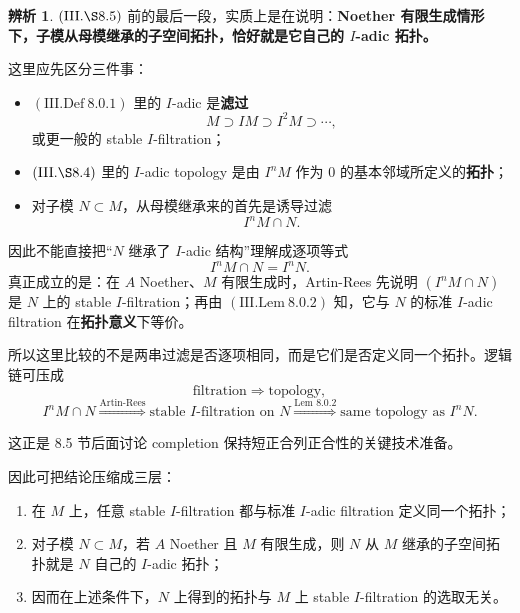 \documentclass[a4paper]{ctexart}
\theoremstyle{definition}
\theoremstyle{analysis}
\newtheorem{remark}{辨析}[section]
\theoremstyle{plain}
\begin{document}
\begin{remark}
\label{rem:artin-rees-subspace-topology}
\((\mathrm{III.\S 8.5})\) 前的最后一段，实质上是在说明：\textbf{Noether 有限生成情形下，子模从母模继承的子空间拓扑，恰好就是它自己的 \(I\)-adic 拓扑。}

这里应先区分三件事：
\begin{itemize}
  \item \((\mathrm{III.Def}\ 8.0.1)\) 里的 \(I\)-adic 是\textbf{滤过}
  \[
    M\supset IM\supset I^2M\supset \cdots,
  \]
  或更一般的 stable \(I\)-filtration；
  \item \((\mathrm{III.\S 8.4})\) 里的 \(I\)-adic topology 是由 \(I^nM\) 作为 \(0\) 的基本邻域所定义的\textbf{拓扑}；
  \item 对子模 \(N\subset M\)，从母模继承来的首先是诱导过滤
  \[
    I^nM\cap N.
  \]
\end{itemize}

因此不能直接把“\(N\) 继承了 \(I\)-adic 结构”理解成逐项等式
\[
  I^nM\cap N = I^nN.
\]
真正成立的是：在 \(A\) Noether、\(M\) 有限生成时，Artin-Rees 先说明 \((I^nM\cap N)\) 是 \(N\) 上的 stable \(I\)-filtration；再由 \((\mathrm{III.Lem}\ 8.0.2)\) 知，它与 \(N\) 的标准 \(I\)-adic filtration 在\textbf{拓扑意义}下等价。

所以这里比较的不是两串过滤是否逐项相同，而是它们是否定义同一个拓扑。逻辑链可压成
\[
\text{filtration}
\Longrightarrow
\text{topology},
\]
\[
  I^nM\cap N
  \overset{\text{Artin-Rees}}{\Longrightarrow}
  \text{stable \(I\)-filtration on }N
  \overset{\text{Lem }8.0.2}{\Longrightarrow}
  \text{same topology as }I^nN.
\]

这正是 8.5 节后面讨论 completion 保持短正合列正合性的关键技术准备。

\medskip

因此可把结论压缩成三层：
\begin{enumerate}
  \item 在 \(M\) 上，任意 stable \(I\)-filtration 都与标准 \(I\)-adic filtration 定义同一个拓扑；
  \item 对子模 \(N\subset M\)，若 \(A\) Noether 且 \(M\) 有限生成，则 \(N\) 从 \(M\) 继承的子空间拓扑就是 \(N\) 自己的 \(I\)-adic 拓扑；
  \item 因而在上述条件下，\(N\) 上得到的拓扑与 \(M\) 上 stable \(I\)-filtration 的选取无关。
\end{enumerate}
\end{remark}
\end{document}
